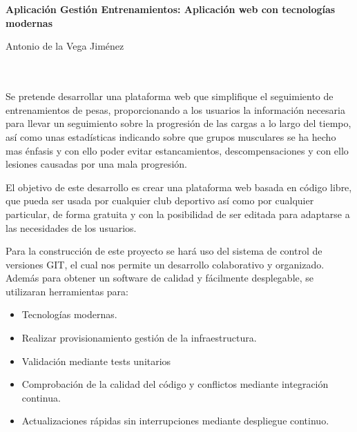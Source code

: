 \chapter*{}






\cleardoublepage
\thispagestyle{empty}

\begin{center}
{\large\bfseries Aplicación Gestión Entrenamientos: Aplicación web con tecnologías modernas}\\
\end{center}
\begin{center}
Antonio de la Vega Jiménez\\
\end{center}

\\

\vspace{0.7cm}
\\

Se pretende desarrollar una plataforma web que simplifique el seguimiento de entrenamientos de pesas, proporcionando a los usuarios la información necesaria para llevar un seguimiento sobre la progresión de las cargas a lo largo del tiempo, así como unas estadísticas indicando sobre que grupos musculares se ha hecho mas énfasis y con ello poder evitar estancamientos, descompensaciones y con ello lesiones causadas por una mala progresión.

El objetivo de este desarrollo es crear una plataforma web basada en código libre, que pueda ser usada por cualquier club deportivo así como por cualquier particular, de forma gratuita y con la posibilidad de ser editada para adaptarse a las necesidades de los usuarios.


Para la construcción de este proyecto se hará uso del sistema de control de versiones GIT, el cual nos permite un desarrollo colaborativo y organizado. Además para obtener un software de calidad y fácilmente desplegable, se utilizaran herramientas para:
\begin{itemize}
  \item Tecnologías modernas.
  \item Realizar provisionamiento gestión de la infraestructura.
  \item Validación mediante tests unitarios
  \item Comprobación de la calidad del código y conflictos mediante integración continua.
  \item Actualizaciones rápidas sin interrupciones mediante despliegue continuo.
\end{itemize}

